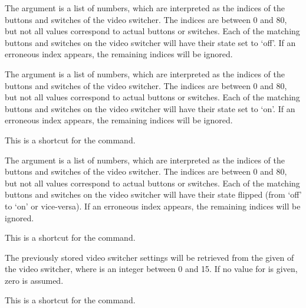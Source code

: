   The argument  is a list of numbers, which are interpreted as the indices of the
  buttons and switches of the video switcher.
  The indices are between 0 and 80, but not all values correspond to actual buttons or switches.
  Each of the matching buttons and switches on the video switcher will have their state set to `off'.
  If an erroneous index appears, the remaining indices will be ignored.

  The argument  is a list of numbers, which are interpreted as the indices of the
  buttons and switches of the video switcher.
  The indices are between 0 and 80, but not all values correspond to actual buttons or switches.
  Each of the matching buttons and switches on the video switcher will have their state set to `on'.
  If an erroneous index appears, the remaining indices will be ignored.

  This is a shortcut for the  command.

  The argument  is a list of numbers, which are interpreted as the indices of the
  buttons and switches of the video switcher.
  The indices are between 0 and 80, but not all values correspond to actual buttons or switches.
  Each of the matching buttons and switches on the video switcher will have their state flipped
  (from `off' to `on' or vice-versa).
  If an erroneous index appears, the remaining indices will be ignored.

  This is a shortcut for the  command.

  The previously stored video switcher settings will be retrieved from the given 
  of the video switcher, where  is an integer between 0 and 15.
  If no value for  is given, zero is assumed.

  This is a shortcut for the  command.

